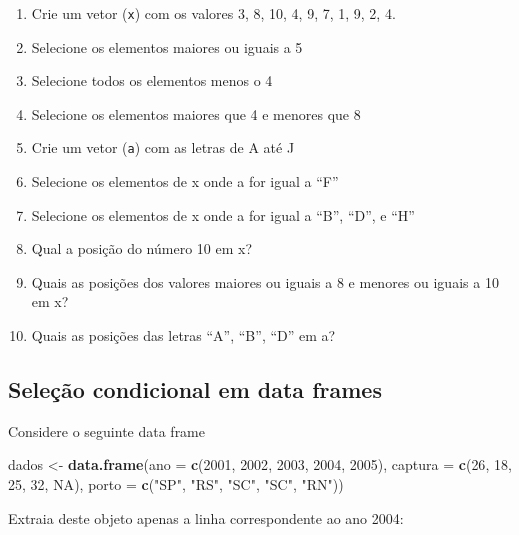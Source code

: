 \documentclass[10pt,a4paper]{book}
\newenvironment{Shaded}{\begin{snugshade}}{\end{snugshade}}
\newcommand{\KeywordTok}[1]{\textcolor[rgb]{0.13,0.29,0.53}{\textbf{#1}}}
\newcommand{\DataTypeTok}[1]{\textcolor[rgb]{0.13,0.29,0.53}{#1}}
\newcommand{\DecValTok}[1]{\textcolor[rgb]{0.00,0.00,0.81}{#1}}
\newcommand{\StringTok}[1]{\textcolor[rgb]{0.31,0.60,0.02}{#1}}
\newcommand{\OtherTok}[1]{\textcolor[rgb]{0.56,0.35,0.01}{#1}}
\newcommand{\NormalTok}[1]{#1}
\providecommand{\tightlist}{%
  \setlength{\itemsep}{0pt}\setlength{\parskip}{0pt}}
\begin{document}
\begin{enumerate}
\def\labelenumi{\arabic{enumi}.}
\tightlist
\item
  Crie um vetor (\texttt{x}) com os valores 3, 8, 10, 4, 9, 7, 1, 9, 2,
  4.
\item
  Selecione os elementos maiores ou iguais a 5
\item
  Selecione todos os elementos menos o 4
\item
  Selecione os elementos maiores que 4 e menores que 8
\item
  Crie um vetor (\texttt{a}) com as letras de A até J
\item
  Selecione os elementos de x onde a for igual a ``F''
\item
  Selecione os elementos de x onde a for igual a ``B'', ``D'', e ``H''
\item
  Qual a posição do número 10 em x?
\item
  Quais as posições dos valores maiores ou iguais a 8 e menores ou
  iguais a 10 em x?
\item
  Quais as posições das letras ``A'', ``B'', ``D'' em a?
\end{enumerate}

\subsection{Seleção condicional em data
frames}\label{selecao-condicional-em-data-frames}

Considere o seguinte data frame

\begin{Shaded}
\begin{Highlighting}[]
\NormalTok{dados <-}\StringTok{ }\KeywordTok{data.frame}\NormalTok{(}\DataTypeTok{ano =} \KeywordTok{c}\NormalTok{(}\DecValTok{2001}\NormalTok{, }\DecValTok{2002}\NormalTok{, }\DecValTok{2003}\NormalTok{, }\DecValTok{2004}\NormalTok{, }\DecValTok{2005}\NormalTok{),}
                    \DataTypeTok{captura =} \KeywordTok{c}\NormalTok{(}\DecValTok{26}\NormalTok{, }\DecValTok{18}\NormalTok{, }\DecValTok{25}\NormalTok{, }\DecValTok{32}\NormalTok{, }\OtherTok{NA}\NormalTok{),}
                    \DataTypeTok{porto =} \KeywordTok{c}\NormalTok{(}\StringTok{"SP"}\NormalTok{, }\StringTok{"RS"}\NormalTok{, }\StringTok{"SC"}\NormalTok{, }\StringTok{"SC"}\NormalTok{, }\StringTok{"RN"}\NormalTok{))}
\end{Highlighting}
\end{Shaded}

Extraia deste objeto apenas a linha correspondente ao ano 2004:
\end{document}
